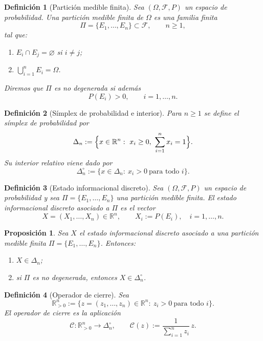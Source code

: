 ﻿\documentclass[12pt]{article}
\newtheorem{definicion}{Definición}[section]
\newtheorem{proposicion}{Proposición}[section]
\begin{document}
\begin{definicion}[Partición medible finita]\label{def:particion}
Sea $(\Omega,\mathcal F,P)$ un espacio de probabilidad. Una \emph{partición medible finita} de $\Omega$ es una familia finita
\[
\Pi=\{E_1,\dots,E_n\}\subset \mathcal F,\qquad n\ge 1,
\]
tal que:
\begin{enumerate}
    \item $E_i\cap E_j=\varnothing$ si $i\neq j$;
    \item $\bigcup_{i=1}^n E_i=\Omega$.
\end{enumerate}

Diremos que $\Pi$ es \emph{no degenerada} si además
\[
P(E_i)>0,\qquad i=1,\dots,n.
\]
\end{definicion}

\begin{definicion}[Símplex de probabilidad e interior]\label{def:simplex}
Para $n\ge 1$ se define el \emph{símplex de probabilidad} por
\[
\Delta_n:=\Bigl\{x\in\mathbb R^n:\ x_i\ge 0,\ \sum_{i=1}^n x_i=1\Bigr\}.
\]
Su interior relativo viene dado por
\[
\Delta_n^\circ:=\{x\in\Delta_n:\ x_i>0\ \text{para todo } i\}.
\]
\end{definicion}

\begin{definicion}[Estado informacional discreto]\label{def:estado}
Sea $(\Omega,\mathcal F,P)$ un espacio de probabilidad y sea $\Pi=\{E_1,\dots,E_n\}$ una partición medible finita. El \emph{estado informacional discreto} asociado a $\Pi$ es el vector
\[
X=(X_1,\dots,X_n)\in\mathbb R^n,\qquad X_i:=P(E_i),\quad i=1,\dots,n.
\]
\end{definicion}

\begin{proposicion}\label{prop:estado_simplex}
Sea $X$ el estado informacional discreto asociado a una partición medible finita $\Pi=\{E_1,\dots,E_n\}$.
Entonces:
\begin{enumerate}
    \item $X\in\Delta_n$;
    \item si $\Pi$ es no degenerada, entonces $X\in\Delta_n^\circ$.
\end{enumerate}
\end{proposicion}

\begin{definicion}[Operador de cierre]\label{def:cierre}
Sea
\[
\mathbb R_{>0}^n:=\{z=(z_1,\dots,z_n)\in\mathbb R^n:\ z_i>0\ \text{para todo } i\}.
\]
El \emph{operador de cierre} es la aplicación
\[
\mathscr{C}:\mathbb R_{>0}^n\to\Delta_n^\circ,\qquad
\mathscr{C}(z):=\frac{1}{\sum_{i=1}^n z_i}\,z.
\]
\end{definicion}
\end{document}
